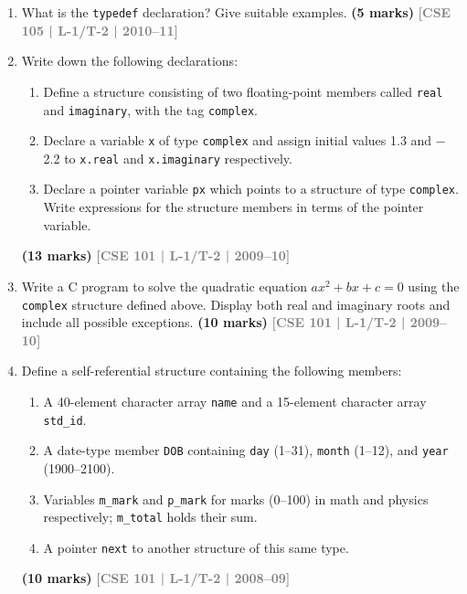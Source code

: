\documentclass[12pt,a3paper]{article}
\newcommand{\yr}[1]{\hfill\textcolor{gray}{\small\textbf{[#1]}}}
\newcommand{\mk}[1]{\textcolor{orange!70!black}{\small\textbf{(#1 marks)}}}
\begin{document}
\begin{enumerate}
\item What is the \texttt{typedef} declaration? Give suitable examples.
\mk{5} \yr{CSE 105 | L-1/T-2 | 2010--11}

\item Write down the following declarations:
\begin{enumerate}
  \item Define a structure consisting of two floating-point members called \texttt{real} and \texttt{imaginary}, with the tag \texttt{complex}.
  \item Declare a variable \texttt{x} of type \texttt{complex} and assign initial values 1.3 and $-$2.2 to \texttt{x.real} and \texttt{x.imaginary} respectively.
  \item Declare a pointer variable \texttt{px} which points to a structure of type \texttt{complex}. Write expressions for the structure members in terms of the pointer variable.
\end{enumerate}
\mk{13} \yr{CSE 101 | L-1/T-2 | 2009--10}

\item Write a C program to solve the quadratic equation $ax^2 + bx + c = 0$ using the \texttt{complex} structure defined above. Display both real and imaginary roots and include all possible exceptions.
\mk{10} \yr{CSE 101 | L-1/T-2 | 2009--10}

\item Define a self-referential structure containing the following members:
\begin{enumerate}
  \item A 40-element character array \texttt{name} and a 15-element character array \texttt{std\_id}.
  \item A date-type member \texttt{DOB} containing \texttt{day} (1--31), \texttt{month} (1--12), and \texttt{year} (1900--2100).
  \item Variables \texttt{m\_mark} and \texttt{p\_mark} for marks (0--100) in math and physics respectively; \texttt{m\_total} holds their sum.
  \item A pointer \texttt{next} to another structure of this same type.
\end{enumerate}
\mk{10} \yr{CSE 101 | L-1/T-2 | 2008--09}


\end{enumerate}
\end{document}
